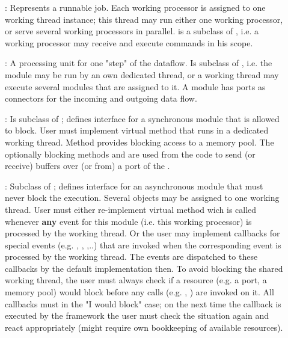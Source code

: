 \begin{description}
\item[] :   
Represents a runnable job. Each 
   working processor is assigned to one working thread instance; 
   this thread may run either one working processor, or serve several
    working processors in parallel. 
     is a subclass of , 
   i.e. a working processor may receive and execute commands in 
   his scope. 

\item[] :  
A processing unit for one "step" of the dataflow. 
   Is subclass of , i.e. the module may be run by an own 
   dedicated thread, or a working thread may execute several modules that 
   are assigned to it. A module has ports as connectors for the 
   incoming and outgoing data flow.   

\item[] : 
Is subclass of ; defines interface for a 
   synchronous module that is allowed to block. User must implement virtual 
   method  that runs in a dedicated working thread. 
   Method  provides blocking access to a memory pool. 
   The optionally blocking methods  and
     are used from the  
    code to send (or receive) buffers over (or from) 
    a port of the .  

\item[] : 
Subclass of ; defines interface for an 
   asynchronous module that must never block the execution. Several 
    objects may be assigned to one working thread. User must 
   either re-implement virtual method  wich is called 
   whenever {\bf any} event for this module (i.e. this working processor) 
   is processed by the working thread. Or the user may implement 
   callbacks for special events (e.g. , 
   , ,..) that are invoked when 
   the corresponding event is processed by the working thread. 
   The events are dispatched to these callbacks by the  
   default implementation then. To avoid blocking the shared working thread, 
   the user must always check if a resource (e.g. a port, a memory pool) 
   would block before any calls (e.g. , ) are invoked on it. 
   All callbacks must  in the "I would block" case; on the next 
   time the callback is executed by the framework the user must check the situation 
   again and react appropriately (might require own bookkeeping of available resources). 


\end{description}

